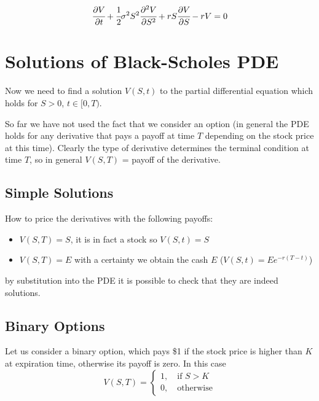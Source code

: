 \begin{equation}
\cfrac{\partial V}{\partial t} + \cfrac{1}{2} \sigma^2 S^2 \cfrac{\partial^2 V}{\partial S^2}+ rS \cfrac{\partial V}{\partial S} - rV = 0
\end{equation}

\section{Solutions of Black-Scholes PDE}
Now we need to find a solution $V(S, t)$ to the partial differential equation which holds for $S >0$, $t \in [0, T)$.

So far we have not used the fact that we consider an option (in general the PDE holds for any derivative that pays a payoff at time $T$ depending on the stock price at this time).
Clearly the type of derivative determines the terminal condition at time $T$, so in general $V(S, T)$ = payoff of the derivative.

\subsection{Simple Solutions}
How to price the derivatives with the following payoffs:
\begin{itemize}
\tightlist
\item $V(S, T) = S$, it is in fact a stock so $V(S, t) = S$
\item $V(S, T) = E$ with a certainty we obtain the cash $E$ ($V(S, t) = Ee^{-r(T-t)}$)
\end{itemize}
by substitution into the PDE it is possible to check that they are indeed solutions.



\subsection{Binary Options}
Let us consider a binary option, which pays \$1 if the stock price is higher than $K$ at expiration time, otherwise its payoff is zero.
In this case
\begin{equation}
V(S, T) = 
\begin{cases}
  1, \quad\textrm{if }S > K\\
  0, \quad\textrm{otherwise}	
\end{cases}
\end{equation}

